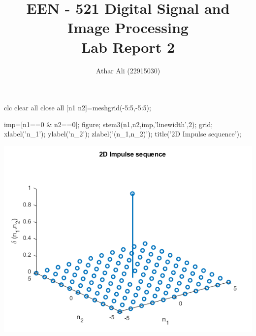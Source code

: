 \documentclass[12pt, onecolumn]{IEEEtran}
\begin{document}
\author{Athar Ali (22915030)}
\title{\bf{ \large EEN - 521 Digital Signal and Image Processing\\ Lab Report 2}}
\maketitle 
{} {}


\vspace{1em}
\begin{matlabcode}
clc
clear all
close all 
[n1 n2]=meshgrid(-5:5,-5:5);
\end{matlabcode}


\begin{matlabcode}
imp=[n1==0 & n2==0]; figure; stem3(n1,n2,imp,'linewidth',2); grid; %
xlabel('n_1'); ylabel('n_2'); zlabel('\delta (n_1,n_2)'); title('2D Impulse sequence');
\end{matlabcode}
\begin{center}
\includegraphics[width=\maxwidth{56.196688409433015em}]{figure_0.png}
\end{center}

\end{document}
